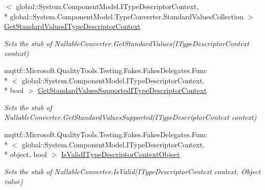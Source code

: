 \begin{DoxyCompactItemize}
$<$ global\-::\-System.\-Component\-Model.\-I\-Type\-Descriptor\-Context, \\*
global\-::\-System.\-Component\-Model.\-Type\-Converter.\-Standard\-Values\-Collection $>$ \hyperlink{class_system_1_1_component_model_1_1_fakes_1_1_stub_nullable_converter_a880f566ff8dafc6b0346b66579719865}{Get\-Standard\-Values\-I\-Type\-Descriptor\-Context}
\begin{DoxyCompactList}\small\item\em Sets the stub of Nullable\-Converter.\-Get\-Standard\-Values(\-I\-Type\-Descriptor\-Context context)\end{DoxyCompactList}\item 
mqttf\-::\-Microsoft.\-Quality\-Tools.\-Testing.\-Fakes.\-Fakes\-Delegates.\-Func\\*
$<$ global\-::\-System.\-Component\-Model.\-I\-Type\-Descriptor\-Context, \\*
bool $>$ \hyperlink{class_system_1_1_component_model_1_1_fakes_1_1_stub_nullable_converter_a758a4443f4f956b7ddebcd341d613e76}{Get\-Standard\-Values\-Supported\-I\-Type\-Descriptor\-Context}
\begin{DoxyCompactList}\small\item\em Sets the stub of Nullable\-Converter.\-Get\-Standard\-Values\-Supported(\-I\-Type\-Descriptor\-Context context)\end{DoxyCompactList}\item 
mqttf\-::\-Microsoft.\-Quality\-Tools.\-Testing.\-Fakes.\-Fakes\-Delegates.\-Func\\*
$<$ global\-::\-System.\-Component\-Model.\-I\-Type\-Descriptor\-Context, \\*
object, bool $>$ \hyperlink{class_system_1_1_component_model_1_1_fakes_1_1_stub_nullable_converter_a758197cacd1b441cc454fbb28071a9f3}{Is\-Valid\-I\-Type\-Descriptor\-Context\-Object}
\begin{DoxyCompactList}\small\item\em Sets the stub of Nullable\-Converter.\-Is\-Valid(\-I\-Type\-Descriptor\-Context context, Object value)\end{DoxyCompactList}\end{DoxyCompactItemize}
